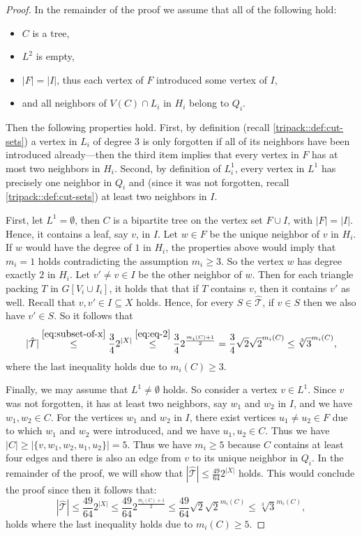 \documentclass[a4paper,UKenglish,cleveref, autoref, thm-restate]{lipics-v2021}
\begin{document}
\begin{proof}
    In the remainder of the proof we assume that all of the following hold:
    \begin{itemize} 
     \item $C$ is a tree, 
     \item $L^2$ is empty, 
     \item $|F| = |I|$, thus each vertex of $F$ introduced some vertex of $I$,
     \item and all neighbors of $V(C) \cap L_i$ in $H_i$ belong to $Q_i$.
    \end{itemize}
    Then the following properties hold.
    First, by definition (recall \cref{tripack::def:cut-sets}) a vertex in $L_i$ of degree 3 is only forgotten if all of its neighbors have been introduced already---then the third item implies that every vertex in $F$ has at most two neighbors in $H_i$.
    Second, by definition of $L^1_i$, every vertex in $L^1$ has precisely one neighbor in $Q_i$ and (since it was not forgotten, recall \cref{tripack::def:cut-sets}) at least two neighbors in $I$.
    
    First, let $L^1 = \emptyset$, then $C$ is a bipartite tree on the vertex set $F\cup I$, with $|F| = |I|$. 
    Hence, it contains a leaf, say $v$, in $I$. 
    Let $w \in F$ be the unique neighbor of $v$ in $H_i$. 
    If $w$ would have the degree of $1$ in $H_i$, the properties above would imply that $m_{i} = 1$ holds contradicting the assumption $m_{i} \geq 3$.
    So the vertex $w$ has degree exactly $2$ in $H_i$. 
    Let $v' \neq v \in I$ be the other neighbor of $w$. 
    Then for each triangle packing $T$ in $G[V_i\cup I_i]$, it holds that that if $T$ contains $v$, then it contains $v'$ as well. 
    Recall that $v, v' \in I \subseteq X$ holds. 
    Hence, for every $S \in \hat{\mathcal{T}}$, if $v\in S$ then we also have $v'\in S$. So it follows that 
    \[
    |\hat{\mathcal{T}}| \stackrel{\eqref{eq:subset-of-x}}{\leq} \frac{3}{4}2^{|X|} \stackrel{\eqref{eq:eq-2}}{\leq} \frac{3}{4}2^{\frac{m_{i}(C)+1}{2}} = \frac{3}{4}\sqrt{2} \sqrt{2}^{m_{i}(C)} \leq \sqrt[3]{3}^{m_{i}(C)},
    \]
    where the last inequality holds due to $m_{i}(C) \geq 3$.

    Finally, we may assume that $L^1\neq \emptyset$ holds. 
    So consider a vertex $v \in L^1$.
    Since $v$ was not forgotten, it has at least two neighbors, say $w_1$ and $w_2$ in $I$, and we have $w_1, w_2 \in C$.
    For the vertices $w_1$ and $w_2$ in $I$, there exist vertices $u_1 \neq u_2 \in F$ due to which $w_1$ and $w_2$ were introduced, and we have $u_1, u_2 \in C$.
    Thus we have $|C| \geq |\{v, w_1, w_2, u_1, u_2\}| = 5$.
    Thus we have $m_{i} \geq 5$ because $C$ contains at least four edges and there is also an edge from $v$ to its unique neighbor in $Q_i$.
    In the remainder of the proof, we will show that $|\hat{\mathcal{T}}| \leq \frac{49}{64} 2^{|X|}$ holds. This would conclude the proof since then it follows that:
    \[
    |\hat{\mathcal{T}}| \leq \frac{49}{64} 2^{|X|} \leq \frac{49}{64} 2^{\frac{m_{i}(C)+1}{2}}\leq \frac{49}{64}\sqrt{2} \sqrt{2}^{m_{i}(C)} \leq \sqrt[3]{3}^{m_{i}(C)},
    \]
    holds where the last inequality holds due to $m_{i}(C) \geq 5$.


\end{proof}
\end{document}
